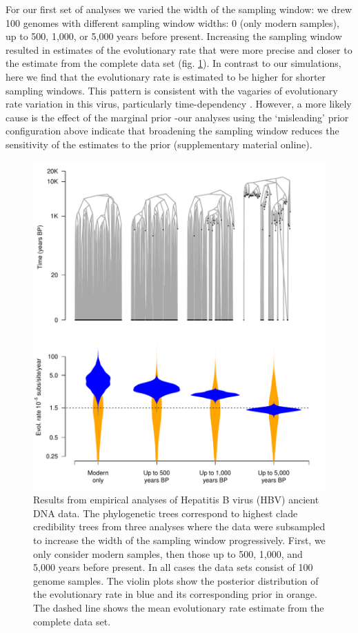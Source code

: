 \documentclass[11pt]{article}
\begin{document}
For our first set of analyses we varied the width of the sampling window: we drew 100 genomes with different sampling window widths: 0 (only modern samples), up to 500, 1,000, or 5,000 years before present. Increasing the sampling window resulted in estimates of the evolutionary rate that were more precise and closer to the estimate from the complete data set (fig. \ref{figure:Fig6}). In contrast to our simulations, here we find that the evolutionary rate is estimated to be higher for shorter sampling windows. This pattern is consistent with the vagaries of evolutionary rate variation in this virus, particularly time-dependency \citep{vrancken2017accurate}. However, a more likely cause is the effect of the marginal prior -our analyses using the `misleading' prior configuration above indicate that broadening the sampling window reduces the sensitivity of the estimates to the prior (supplementary material online).

\begin{figure}[H]
    \begin{center}
        \includegraphics[scale=0.7, angle=0]{empirical_results_depth.pdf}
        \caption{Results from empirical analyses of Hepatitis B virus (HBV) ancient DNA data. The phylogenetic trees correspond to highest clade credibility trees from three analyses where the data were subsampled to increase the width of the sampling window progressively. First, we only consider modern samples, then those up to 500, 1,000, and 5,000 years before present. In all cases the data sets consist of 100 genome samples. The violin plots show the posterior distribution of the evolutionary rate in blue and its corresponding prior in orange. The dashed line shows the mean evolutionary rate estimate from the complete data set.}
        \label{figure:Fig6}
    \end{center}
\end{figure}
\end{document}
